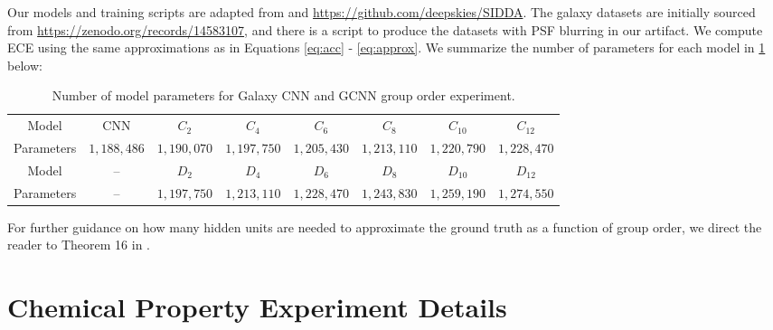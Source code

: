 \documentclass[10pt]{article} %
\theoremstyle{definition}
\begin{document}
Our models and training scripts are adapted from \cite{sneh_mlst} and \url{https://github.com/deepskies/SIDDA}. The galaxy datasets are initially sourced from \url{https://zenodo.org/records/14583107}, and there is a script to produce the datasets with PSF blurring in our artifact. We compute ECE using the same approximations as in Equations \ref{eq:acc} - \ref{eq:approx}. We summarize the number of parameters for each model in \cref{tab:gcnn_params} below:


\begin{table}[!htb]
    \centering
    \begin{tabular}{c|ccccccc}
    Model   & CNN & $C_2$ & $C_4$ & $C_6$ & $C_8$ & $C_{10}$ & $C_{12}$ \\
    Parameters    & $1,188,486$ & $1,190,070$ & $1,197,750$ & $1,205,430$ & $1,213,110$ & $1,220,790$ & $1,228,470$ \\ \hline 
    Model & --  & $D_2$ & $D_4$ & $D_6 $ & $D_8$ & $D_{10}$ & $D_{12}$  \\
    Parameters & --  & $1,197,750$  & $1,213,110$ & $1,228,470$ & $1,243,830$ & $1,259,190$ & $1,274,550$   \\
    \end{tabular}
    \caption{Number of model parameters for Galaxy CNN and GCNN group order experiment.}
    \label{tab:gcnn_params}
\end{table}

For further guidance on how many hidden units are needed to approximate the ground truth as a function of group order, we direct the reader to Theorem 16 in \cite{lawrence2022barron}.

\section{Chemical Property Experiment Details} \label{sec:chem_prop}
\end{document}
